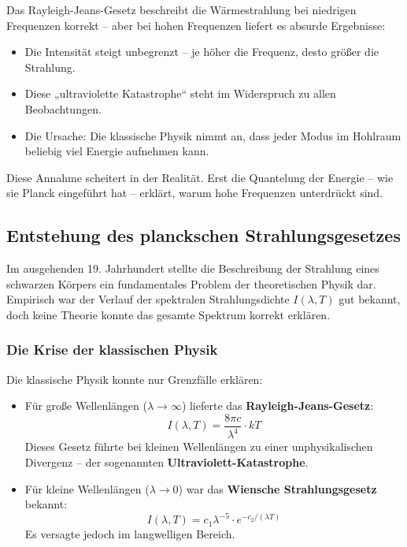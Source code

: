 \medskip
\begin{tcolorbox}[didaktikbox, title=Warum versagt die klassische Theorie?]
	\label{box:klassik-versagt}
	Das Rayleigh-Jeans-Gesetz beschreibt die Wärmestrahlung bei niedrigen Frequenzen korrekt – aber bei hohen Frequenzen liefert es absurde Ergebnisse:
	
	\begin{itemize}
		\item Die Intensität steigt unbegrenzt – je höher die Frequenz, desto größer die Strahlung.
		\item Diese „ultraviolette Katastrophe“ steht im Widerspruch zu allen Beobachtungen.
		\item Die Ursache: Die klassische Physik nimmt an, dass jeder Modus im Hohlraum beliebig viel Energie aufnehmen kann.
	\end{itemize}
	
	Diese Annahme scheitert in der Realität. Erst die Quantelung der Energie – wie sie Planck eingeführt hat – erklärt, warum hohe Frequenzen unterdrückt sind.
\end{tcolorbox}

\vspace{-1.2em}

\subsection{Entstehung des planckschen Strahlungsgesetzes}

Im ausgehenden 19. Jahrhundert stellte die Beschreibung der Strahlung eines schwarzen Körpers ein fundamentales Problem der theoretischen Physik dar. Empirisch war der Verlauf der spektralen Strahlungsdichte \( I(\lambda, T) \) gut bekannt, doch keine Theorie konnte das gesamte Spektrum korrekt erklären.

\subsubsection{Die Krise der klassischen Physik}

Die klassische Physik konnte nur Grenzfälle erklären:

\begin{itemize}
	\item Für große Wellenlängen (\(\lambda \to \infty\)) lieferte das \textbf{Rayleigh-Jeans-Gesetz}:
	\[
	I(\lambda, T) = \frac{8\pi c}{\lambda^4} \cdot kT
	\]
	Dieses Gesetz führte bei kleinen Wellenlängen zu einer unphysikalischen Divergenz – der sogenannten \textbf{Ultraviolett-Katas\-trophe}.
	
	\item Für kleine Wellenlängen (\(\lambda \to 0\)) war das \textbf{Wiensche Strahlungsgesetz} bekannt:
	\[
	I(\lambda, T) = c_1 \lambda^{-5} \cdot e^{-c_2/(\lambda T)}
	\]
	Es versagte jedoch im langwelligen Bereich.
\end{itemize}

